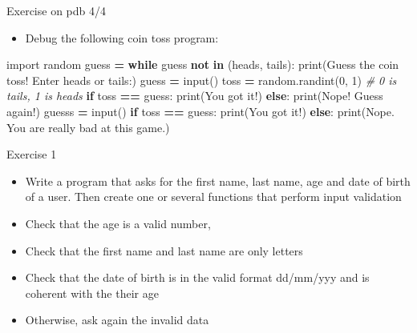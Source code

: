 \documentclass[
  8pt,
  ignorenonframetext,
]{beamer}
\newenvironment{Shaded}{\begin{snugshade}}{\end{snugshade}}
\newcommand{\BuiltInTok}[1]{#1}
\newcommand{\CommentTok}[1]{\textcolor[rgb]{0.56,0.35,0.01}{\textit{#1}}}
\newcommand{\ControlFlowTok}[1]{\textcolor[rgb]{0.13,0.29,0.53}{\textbf{#1}}}
\newcommand{\DecValTok}[1]{\textcolor[rgb]{0.00,0.00,0.81}{#1}}
\newcommand{\ImportTok}[1]{#1}
\newcommand{\KeywordTok}[1]{\textcolor[rgb]{0.13,0.29,0.53}{\textbf{#1}}}
\newcommand{\NormalTok}[1]{#1}
\newcommand{\OperatorTok}[1]{\textcolor[rgb]{0.81,0.36,0.00}{\textbf{#1}}}
\newcommand{\StringTok}[1]{\textcolor[rgb]{0.31,0.60,0.02}{#1}}
\providecommand{\tightlist}{%
  \setlength{\itemsep}{0pt}\setlength{\parskip}{0pt}}
\begin{document}
\begin{frame}[fragile]{Exercise on pdb 4/4}
\protect\hypertarget{exercise-on-pdb-44}{}
\begin{itemize}
\tightlist
\item
  Debug the following coin toss program:
\end{itemize}

\begin{Shaded}
\begin{Highlighting}[]
\ImportTok{import}\NormalTok{ random}
\NormalTok{guess }\OperatorTok{=} \StringTok{\textquotesingle{}\textquotesingle{}}
\ControlFlowTok{while}\NormalTok{ guess }\KeywordTok{not} \KeywordTok{in}\NormalTok{ (}\StringTok{\textquotesingle{}heads\textquotesingle{}}\NormalTok{, }\StringTok{\textquotesingle{}tails\textquotesingle{}}\NormalTok{):}
    \BuiltInTok{print}\NormalTok{(}\StringTok{\textquotesingle{}Guess the coin toss! Enter heads or tails:\textquotesingle{}}\NormalTok{)}
\NormalTok{    guess }\OperatorTok{=} \BuiltInTok{input}\NormalTok{()}
\NormalTok{toss }\OperatorTok{=}\NormalTok{ random.randint(}\DecValTok{0}\NormalTok{, }\DecValTok{1}\NormalTok{) }\CommentTok{\# 0 is tails, 1 is heads}
\ControlFlowTok{if}\NormalTok{ toss }\OperatorTok{==}\NormalTok{ guess:}
    \BuiltInTok{print}\NormalTok{(}\StringTok{\textquotesingle{}You got it!\textquotesingle{}}\NormalTok{)}
\ControlFlowTok{else}\NormalTok{:}
    \BuiltInTok{print}\NormalTok{(}\StringTok{\textquotesingle{}Nope! Guess again!\textquotesingle{}}\NormalTok{)}
\NormalTok{    guesss }\OperatorTok{=} \BuiltInTok{input}\NormalTok{()}
    \ControlFlowTok{if}\NormalTok{ toss }\OperatorTok{==}\NormalTok{ guess:}
        \BuiltInTok{print}\NormalTok{(}\StringTok{\textquotesingle{}You got it!\textquotesingle{}}\NormalTok{)}
    \ControlFlowTok{else}\NormalTok{:}
        \BuiltInTok{print}\NormalTok{(}\StringTok{\textquotesingle{}Nope. You are really bad at this game.\textquotesingle{}}\NormalTok{)}
\end{Highlighting}
\end{Shaded}
\end{frame}

\begin{frame}{Exercise 1}
\protect\hypertarget{exercise-1}{}
\begin{itemize}
\item
  Write a program that asks for the first name, last name, age and date
  of birth of a user. Then create one or several functions that perform
  input validation
\item
  Check that the age is a valid number,
\item
  Check that the first name and last name are only letters
\item
  Check that the date of birth is in the valid format dd/mm/yyy and is
  coherent with the their age
\item
  Otherwise, ask again the invalid data
\end{itemize}
\end{frame}
\end{document}
